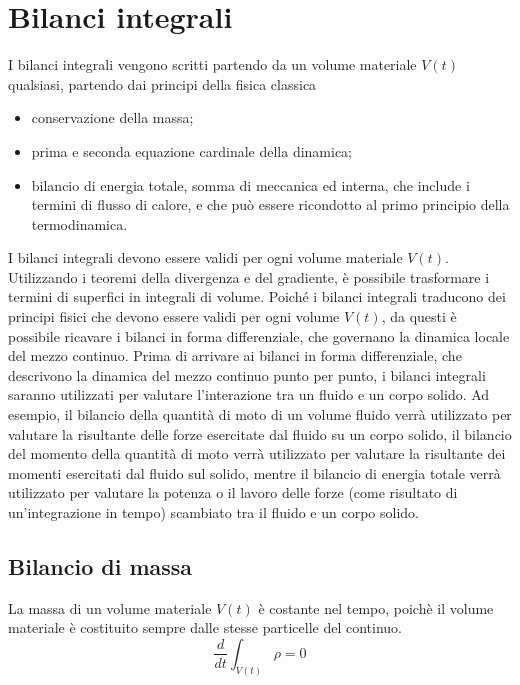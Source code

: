 \section{Bilanci integrali}
I bilanci integrali vengono scritti partendo da un volume materiale $V(t)$ qualsiasi, partendo dai principi della fisica classica
\begin{itemize}
  \item conservazione della massa;
  \item prima e seconda equazione cardinale della dinamica;
  \item bilancio di energia totale, somma di meccanica ed interna, che include i termini di flusso di calore, e che può essere
        ricondotto al primo principio della termodinamica.
\end{itemize}
I bilanci integrali devono essere validi per ogni volume materiale $V(t)$. Utilizzando i teoremi della divergenza e del gradiente, è possibile trasformare i termini di superfici in integrali di volume. Poiché i bilanci integrali traducono dei principi fisici che devono essere validi per ogni volume $V(t)$, da questi è possibile ricavare i bilanci in forma differenziale, che governano la dinamica locale del mezzo continuo. Prima di arrivare ai bilanci in forma differenziale, che descrivono la dinamica del mezzo continuo punto per punto, i bilanci integrali saranno utilizzati per valutare l'interazione tra un fluido e un corpo solido. Ad esempio, il bilancio della quantità di moto di un volume fluido verrà utilizzato per valutare la risultante delle forze esercitate dal fluido su un corpo solido, il bilancio del momento della quantità di moto verrà utilizzato per valutare la risultante dei momenti esercitati dal fluido sul solido, mentre il bilancio di energia totale verrà utilizzato per valutare la potenza o il lavoro delle forze (come risultato di un'integrazione in tempo) scambiato tra il fluido e un corpo solido.

\subsection{Bilancio di massa}
 La massa di un volume materiale $V(t)$ è costante nel tempo, poichè il volume materiale è costituito sempre dalle stesse particelle del
 continuo.
\begin{equation}
 \dfrac{d}{dt} \int_{V(t)} \rho = 0
\end{equation}


